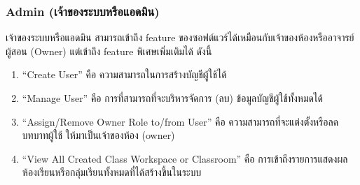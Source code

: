 \documentclass[12pt,one side,openright,a4paper]{cpe-thesis-th}
\newcommand{\thaijustify}[1]{%
  \par\hspace{30pt}\justifying
  #1
}
\begin{document}
        \subsubsection{Admin (เจ้าของระบบหรือแอดมิน)}
            \thaijustify{
                เจ้าของระบบหรือแอดมิน สามารถเข้าถึง feature ของซอฟต์แวร์ได้เหมือนกับเจ้าของห้องหรืออาจารย์ผู้สอน (Owner) แต่เข้าถึง feature พิเศษเพิ่มเติมได้ ดังนี้
            }
            \begin{enumerate}
                \item “Create User” คือ ความสามารถในการสร้างบัญชีผู้ใช้ได้
                \item “Manage User” คือ การที่สามารถที่จะบริหารจัดการ (ลบ) ข้อมูลบัญชีผู้ใช้ทั้งหมดได้
                \item “Assign/Remove Owner Role to/from User” คือ ความสามารถที่จะแต่งตั้งหรือลดบทบาทผู้ใช้ ให้มาเป็นเจ้าของห้อง (owner)
                \item “View All Created Class Workspace or Classroom” คือ การเข้าถึงรายการแสดงผลห้องเรียนหรือกลุ่มเรียนทั้งหมดที่ได้สร้างขึ้นในระบบ
            \end{enumerate}
    \pagebreak
    
\end{document}
